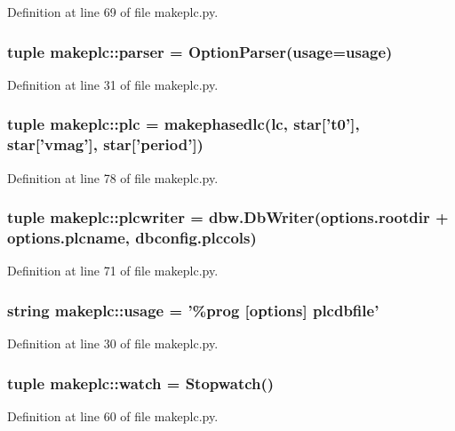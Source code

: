 Definition at line 69 of file makeplc.py.

\hypertarget{namespacemakeplc_aab6ec9062bd8992b365ca1b87bdefa96}{
\subsubsection[{parser}]{\setlength{\rightskip}{0pt plus 5cm}tuple {\bf makeplc::parser} = OptionParser({\bf usage}={\bf usage})}}
\label{namespacemakeplc_aab6ec9062bd8992b365ca1b87bdefa96}


Definition at line 31 of file makeplc.py.

\hypertarget{namespacemakeplc_a4f42d119fcf8a7c4857425571da8bcf4}{
\subsubsection[{plc}]{\setlength{\rightskip}{0pt plus 5cm}tuple {\bf makeplc::plc} = makephasedlc({\bf lc}, star\mbox{[}'t0'\mbox{]}, star\mbox{[}'vmag'\mbox{]}, star\mbox{[}'period'\mbox{]})}}
\label{namespacemakeplc_a4f42d119fcf8a7c4857425571da8bcf4}


Definition at line 78 of file makeplc.py.

\hypertarget{namespacemakeplc_a2c82609fe79c419d6b3d30f44248d69d}{
\subsubsection[{plcwriter}]{\setlength{\rightskip}{0pt plus 5cm}tuple {\bf makeplc::plcwriter} = dbw.DbWriter(options.rootdir + options.plcname, dbconfig.plccols)}}
\label{namespacemakeplc_a2c82609fe79c419d6b3d30f44248d69d}


Definition at line 71 of file makeplc.py.

\hypertarget{namespacemakeplc_a9a367257ba494afb85e43b8b3330f85d}{
\subsubsection[{usage}]{\setlength{\rightskip}{0pt plus 5cm}string {\bf makeplc::usage} = '\%prog \mbox{[}options\mbox{]} plcdbfile'}}
\label{namespacemakeplc_a9a367257ba494afb85e43b8b3330f85d}


Definition at line 30 of file makeplc.py.

\hypertarget{namespacemakeplc_a1864a766ba17f82fb5daa30ec53ebfee}{
\subsubsection[{watch}]{\setlength{\rightskip}{0pt plus 5cm}tuple {\bf makeplc::watch} = Stopwatch()}}
\label{namespacemakeplc_a1864a766ba17f82fb5daa30ec53ebfee}


Definition at line 60 of file makeplc.py.

